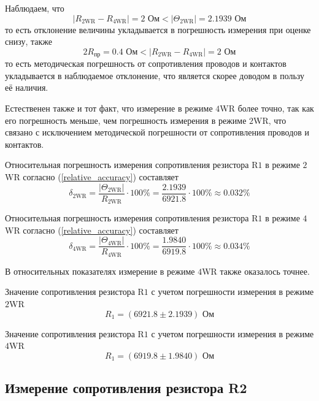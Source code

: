 \documentclass[12pt,a4paper]{article}
\begin{document}
Наблюдаем, что
\begin{equation*}
\left|R_{2\text{WR}} - R_{4\text{WR}}\right| = 2 \text{ Ом} < \left|\Theta_{2\text{WR}}\right| = 2.1939 \text{ Ом}
\end{equation*}
то есть отклонение величины укладывается в погрешность измерения при оценке снизу, также 
\begin{equation*}
2R_{\text{пр}} = 0.4 \text{ Ом} < \left|R_{2\text{WR}} - R_{4\text{WR}}\right| = 2 \text{ Ом}
\end{equation*}
то есть методическая погрешность от сопротивления проводов и контактов укладывается в 
наблюдаемое отклонение, что является скорее доводом в пользу её наличия.

Естественен также и тот факт, что измерение в режиме $4$WR более точно, так как 
его погрешность меньше, чем погрешность измерения в режиме $2$WR, что связано с 
исключением методической погрешности от сопротивления проводов и контактов.

Относительная погрешность измерения сопротивления резистора R$1$ в режиме $2$WR согласно (\ref{relative_accuracy}) составляет
\begin{equation*}
\delta_{2\text{WR}} = \frac{\left|\Theta_{2\text{WR}}\right|}{R_{2\text{WR}}} \cdot 100\% = \frac{2.1939}{6921.8} \cdot 100\% \approx 0.032\%
\end{equation*}

Относительная погрешность измерения сопротивления резистора R$1$ в режиме $4$WR согласно (\ref{relative_accuracy}) составляет
\begin{equation*}
\delta_{4\text{WR}} = \frac{\left|\Theta_{4\text{WR}}\right|}{R_{4\text{WR}}} \cdot 100\% = \frac{1.9840}{6919.8} \cdot 100\% \approx 0.034\%
\end{equation*}

В относительных показателях измерение в режиме $4$WR также оказалось точнее.

Значение сопротивления резистора R$1$ с учетом погрешности измерения в режиме $2$WR
\begin{equation*}
R_{1} = (6921.8 \pm 2.1939) \text{ Ом}
\end{equation*}

Значение сопротивления резистора R$1$ с учетом погрешности измерения в режиме $4$WR
\begin{equation*}
R_{1} = (6919.8 \pm 1.9840) \text{ Ом}
\end{equation*}

\subsection{Измерение сопротивления резистора R2}
\end{document}
